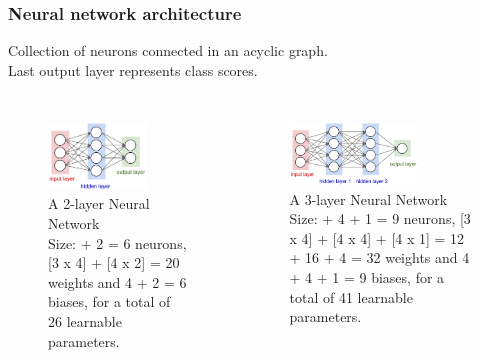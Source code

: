 \begin{frame}
        \frametitle{Neural network architecture}

	Collection of neurons connected in an acyclic graph.\\
	Last output layer represents class scores.

        \begin{columns}
                \begin{figure}
                        \includegraphics[width=0.7\textwidth]{Pics/neural_net}\\
                        \small{A 2-layer Neural Network}\\
			Size:  + 2 = 6 neurons, [3 x 4] + [4 x 2] = 20 weights and 4 + 2 = 6 biases, for a total of 26 learnable parameters.
                \end{figure}
                \begin{figure}
                        \includegraphics[width=0.7\textwidth]{Pics/neural_net2}\\
                        \small{A 3-layer Neural Network}\\
			Size:  + 4 + 1 = 9 neurons, [3 x 4] + [4 x 4] + [4 x 1] = 12 + 16 + 4 = 32 weights and 4 + 4 + 1 = 9 biases, for a total of 41 learnable parameters.
                \end{figure}

        \end{columns}

\end{frame}

